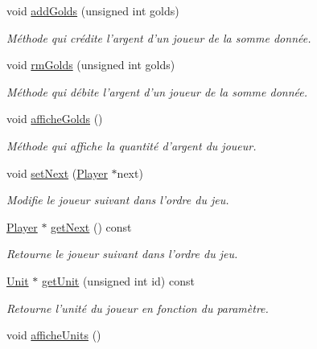\begin{DoxyCompactItemize}
void \hyperlink{classPlayer_a3b8380f4cd58fe75a985c0c2e3f32c8a}{add\+Golds} (unsigned int golds)
\begin{DoxyCompactList}\small\item\em Méthode qui crédite l'argent d'un joueur de la somme donnée. \end{DoxyCompactList}\item 
void \hyperlink{classPlayer_a375e40b8080b58b5fe5296d44ab74f8e}{rm\+Golds} (unsigned int golds)
\begin{DoxyCompactList}\small\item\em Méthode qui débite l'argent d'un joueur de la somme donnée. \end{DoxyCompactList}\item 
\hypertarget{classPlayer_a93eb96604ac6b679bda65a8bb18083ee}{void \hyperlink{classPlayer_a93eb96604ac6b679bda65a8bb18083ee}{affiche\+Golds} ()}\label{classPlayer_a93eb96604ac6b679bda65a8bb18083ee}

\begin{DoxyCompactList}\small\item\em Méthode qui affiche la quantité d'argent du joueur. \end{DoxyCompactList}\item 
void \hyperlink{classPlayer_aa25996d64c6b562ac737c548bdc687a6}{set\+Next} (\hyperlink{classPlayer}{Player} $\ast$next)
\begin{DoxyCompactList}\small\item\em Modifie le joueur suivant dans l'ordre du jeu. \end{DoxyCompactList}\item 
\hyperlink{classPlayer}{Player} $\ast$ \hyperlink{classPlayer_a6f9f2357bacaeb64a926b98da355afd7}{get\+Next} () const 
\begin{DoxyCompactList}\small\item\em Retourne le joueur suivant dans l'ordre du jeu. \end{DoxyCompactList}\item 
\hyperlink{classUnit}{Unit} $\ast$ \hyperlink{classPlayer_af8d6f506784f7dc1c1dd49db84f31831}{get\+Unit} (unsigned int id) const 
\begin{DoxyCompactList}\small\item\em Retourne l'unité du joueur en fonction du paramètre. \end{DoxyCompactList}\item 
\hypertarget{classPlayer_a2e72d8952b9fa896bd750e24ec5c6497}{void \hyperlink{classPlayer_a2e72d8952b9fa896bd750e24ec5c6497}{affiche\+Units} ()}\label{classPlayer_a2e72d8952b9fa896bd750e24ec5c6497}


\end{DoxyCompactItemize}
